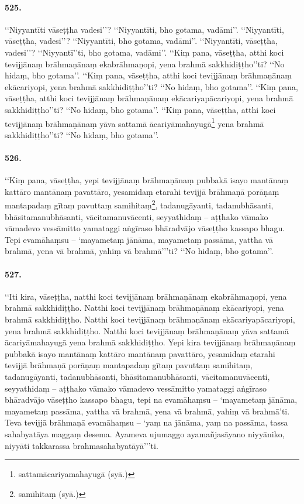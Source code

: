 \paragraph{525.} ‘‘Niyyantīti vāseṭṭha vadesi’’? ‘‘Niyyantīti, bho gotama, vadāmi’’. ‘‘Niyyantīti, vāseṭṭha, vadesi’’? ‘‘Niyyantīti, bho gotama, vadāmi’’. ‘‘Niyyantīti, vāseṭṭha, vadesi’’? ‘‘Niyyantī’’ti, bho gotama, vadāmi’’. ‘‘Kiṃ pana, vāseṭṭha, atthi koci tevijjānaṃ brāhmaṇānaṃ ekabrāhmaṇopi, yena brahmā sakkhidiṭṭho’’ti? ‘‘No hidaṃ, bho gotama’’. ‘‘Kiṃ pana, vāseṭṭha, atthi koci tevijjānaṃ brāhmaṇānaṃ ekācariyopi, yena brahmā sakkhidiṭṭho’’ti? ‘‘No hidaṃ, bho gotama’’. ‘‘Kiṃ pana, vāseṭṭha, atthi koci tevijjānaṃ brāhmaṇānaṃ ekācariyapācariyopi, yena brahmā sakkhidiṭṭho’’ti? ‘‘No hidaṃ, bho gotama’’. ‘‘Kiṃ pana, vāseṭṭha, atthi koci tevijjānaṃ brāhmaṇānaṃ yāva sattamā ācariyāmahayugā\footnote{sattamācariyamahayugā (syā.)} yena brahmā sakkhidiṭṭho’’ti? ‘‘No hidaṃ, bho gotama’’.

\paragraph{526.} ‘‘Kiṃ pana, vāseṭṭha, yepi tevijjānaṃ brāhmaṇānaṃ pubbakā isayo mantānaṃ kattāro mantānaṃ pavattāro, yesamidaṃ etarahi tevijjā brāhmaṇā porāṇaṃ mantapadaṃ gītaṃ pavuttaṃ samihitaṃ\footnote{samīhitaṃ (syā.)}, tadanugāyanti, tadanubhāsanti, bhāsitamanubhāsanti, vācitamanuvācenti, seyyathidaṃ – aṭṭhako vāmako vāmadevo vessāmitto yamataggi aṅgīraso bhāradvājo vāseṭṭho kassapo bhagu. Tepi evamāhaṃsu – ‘mayametaṃ jānāma, mayametaṃ passāma, yattha vā brahmā, yena vā brahmā, yahiṃ vā brahmā’’’ti? ‘‘No hidaṃ, bho gotama’’.

\paragraph{527.} ‘‘Iti kira, vāseṭṭha, natthi koci tevijjānaṃ brāhmaṇānaṃ ekabrāhmaṇopi, yena brahmā sakkhidiṭṭho. Natthi koci tevijjānaṃ brāhmaṇānaṃ ekācariyopi, yena brahmā sakkhidiṭṭho. Natthi koci tevijjānaṃ brāhmaṇānaṃ ekācariyapācariyopi, yena brahmā sakkhidiṭṭho. Natthi koci tevijjānaṃ brāhmaṇānaṃ yāva sattamā ācariyāmahayugā yena brahmā sakkhidiṭṭho. Yepi kira tevijjānaṃ brāhmaṇānaṃ pubbakā isayo mantānaṃ kattāro mantānaṃ pavattāro, yesamidaṃ etarahi tevijjā brāhmaṇā porāṇaṃ mantapadaṃ gītaṃ pavuttaṃ samihitaṃ, tadanugāyanti, tadanubhāsanti, bhāsitamanubhāsanti, vācitamanuvācenti, seyyathidaṃ – aṭṭhako vāmako vāmadevo vessāmitto yamataggi aṅgīraso bhāradvājo vāseṭṭho kassapo bhagu, tepi na evamāhaṃsu – ‘mayametaṃ jānāma, mayametaṃ passāma, yattha vā brahmā, yena vā brahmā, yahiṃ vā brahmā’ti. Teva tevijjā brāhmaṇā evamāhaṃsu – ‘yaṃ na jānāma, yaṃ na passāma, tassa sahabyatāya maggaṃ desema. Ayameva ujumaggo ayamañjasāyano niyyāniko, niyyāti takkarassa brahmasahabyatāyā’’’ti.

